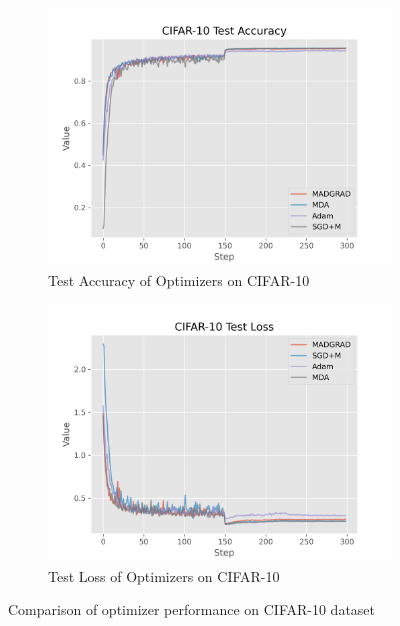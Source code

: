 \documentclass{article}
\begin{document}
\begin{figure}[H]
  \centering
  \begin{subfigure}{.5\textwidth}
    \centering
    \includegraphics[width=\linewidth]{../ftrl_dl_data/CIFAR-10_test_acc.png}
    \caption{Test Accuracy of Optimizers on CIFAR-10}
    \label{fig:sub1}
  \end{subfigure}%
  \begin{subfigure}{.5\textwidth}
    \centering
    \includegraphics[width=\linewidth]{../ftrl_dl_data/CIFAR-10_test_loss.png}
    \caption{Test Loss of Optimizers on CIFAR-10}
    \label{fig:sub2}
  \end{subfigure}
  \caption{Comparison of optimizer performance on CIFAR-10 dataset}
  \label{fig:test}
\end{figure}
\end{document}
